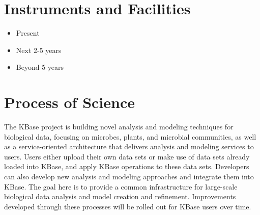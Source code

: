 \documentclass[10pt,a4paper]{report}
\begin{document}
\section{Instruments and Facilities}


\begin{itemize}
\item Present
\item Next 2-5 years
\item Beyond 5 years
\end{itemize}

\section{Process of Science}
The KBase project is building novel analysis and modeling techniques for biological data, 
focusing on microbes, plants, and microbial communities, as well as a 
service-oriented architecture that delivers analysis and modeling services to users. Users either upload 
their own data sets or make use of data sets already loaded into KBase, and apply KBase 
operations to these data sets.  Developers can also develop new analysis and modeling approaches and integrate them 
into KBase. The goal here is to provide a common infrastructure for 
large-scale biological data analysis and model creation and refinement. Improvements developed 
through these processes will be rolled out for KBase users over time.
\end{document}
